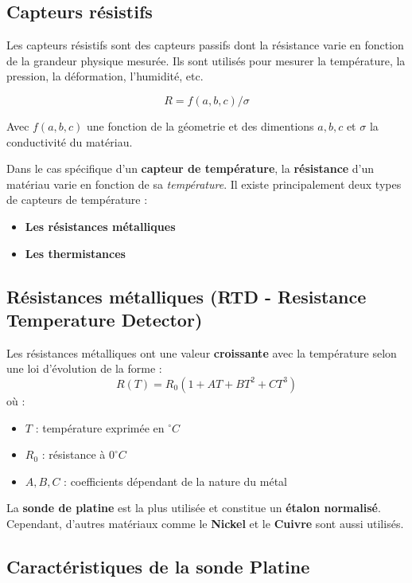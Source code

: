 \subsection*{Capteurs résistifs}
Les capteurs résistifs sont des capteurs passifs dont la résistance varie en
fonction de la grandeur physique mesurée. Ils sont utilisés pour mesurer la
température, la pression, la déformation, l'humidité, etc.

\[
    R = f(a,b,c)/\sigma
\]

Avec \(f(a,b,c)\) une fonction de la g\'eometrie et des dimentions \(a,b,c\) et 
\(\sigma\) la conductivit\'e du mat\'eriau.

Dans le cas spécifique d’un \textbf{capteur de température}, la 
\textbf{résistance} d’un matériau varie en fonction de sa \textit{température}.  
Il existe principalement deux types de capteurs de température :
\begin{itemize}
    \item \textbf{Les résistances métalliques}
    \item \textbf{Les thermistances}
\end{itemize}

\subsection*{Résistances métalliques (RTD - Resistance Temperature Detector)}

Les résistances métalliques ont une valeur \textbf{croissante} avec la 
température selon une loi d’évolution de la forme :
\begin{equation}
    R(T) = R_0 (1 + A T + B T^2 + C T^3)
\end{equation}
où :
\begin{itemize}
    \item \( T \) : température exprimée en \(^\circ C\)
    \item \( R_0 \) : résistance à \( 0^\circ C \)
    \item \( A, B, C \) : coefficients dépendant de la nature du métal
\end{itemize}

La \textbf{sonde de platine} est la plus utilisée et constitue un 
\textbf{étalon normalisé}. Cependant, d’autres matériaux comme le \textbf{Nickel} 
et le \textbf{Cuivre} sont aussi utilisés.

\subsection*{Caractéristiques de la sonde Platine}

